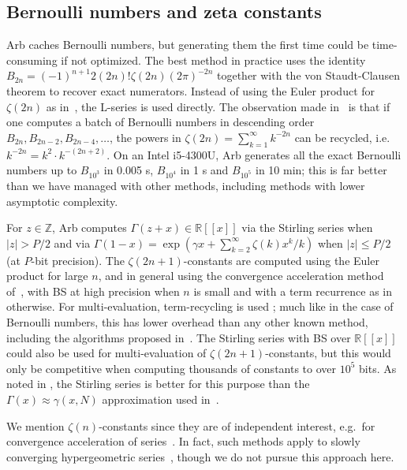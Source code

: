 \documentclass[review,nohypdvips]{siamart0216}
\begin{document}
\subsection{Bernoulli numbers and zeta constants}

Arb caches Bernoulli numbers, but generating them the first time
could be time-consuming if not optimized.
The best method in practice uses the identity
$B_{2n} = (-1)^{n+1} 2(2n)! \zeta(2n) (2\pi)^{-2n}$
together with the von Staudt-Clausen theorem
to recover exact numerators.
Instead of using the Euler product for $\zeta(2n)$ as in~\cite{fillebrown1992faster},
the L-series is used directly.
The observation made in~\cite{bloemen}
is that if one computes a batch of Bernoulli numbers
in descending order $B_{2n}, B_{2n-2}, B_{2n-4}, \ldots$, the powers in
$\zeta(2n) = \sum_{k=1}^{\infty} k^{-2n}$
can be recycled, i.e.\ $k^{-2n} = k^2 \cdot k^{-(2n+2)}$.
On an Intel i5-4300U, Arb generates all the exact Bernoulli
numbers up to $B_{10^3}$ in 0.005 s,
$B_{10^4}$ in 1 s and $B_{10^5}$ in 10 min;
this is far better than
we have managed with other
methods, including methods with lower asymptotic complexity.

For $z \in \mathbb{Z}$, Arb computes $\Gamma(z+x) \in \mathbb{R}[[x]]$ via the Stirling series
when $|z| > P / 2$ and via
$\Gamma(1-x) = \exp\left(\gamma x + \sum_{k=2}^\infty \zeta(k) x^{k} / k \right)$
when $|z| \le P / 2$ (at $P$-bit precision).
The $\zeta(2n+1)$-constants are computed using the Euler product for large $n$,
and in general using the convergence acceleration method of~\cite{Borwein2000},
with BS at high precision when $n$ is small and with a term recurrence as in~\cite{mpfralg}
otherwise. For multi-evaluation, term-recycling is used \cite[Algorithm~4.7.1]{Johansson2014thesis};
much like in the case of Bernoulli numbers, this
has lower overhead than any other known method, including the algorithms proposed in~\cite{BorweinBradleyCrandall2000}.
The Stirling series with BS over $\mathbb{R}[[x]]$ could also be used
for multi-evaluation of $\zeta(2n+1)$-constants,
but this would only be competitive when computing thousands of constants
to over $10^5$ bits. As noted in \cite{Johansson2014thesis}, the Stirling series is better
for this purpose than
the $\Gamma(x) \approx \gamma(x,N)$ approximation
used in~\cite{Karatsuba1998,BorweinBradleyCrandall2000}.

We mention $\zeta(n)$-constants since they are of independent interest,
e.g.\ for convergence acceleration of series~\cite{flajolet1996zeta}.
In fact, such methods apply to slowly converging hypergeometric series~\cite{bogolubsky2006fast,skorokhodov2005method},
though we do not pursue this approach here.
\end{document}
